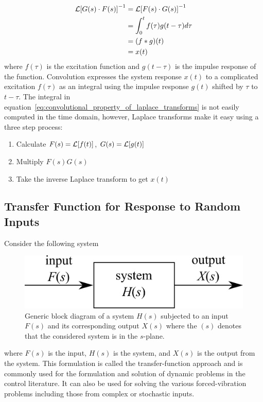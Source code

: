 \documentclass[12pt,letter]{article}
\begin{document}
\begin{align}
\label{eq:convolutional_property_of_laplace_transforms}
\mathcal{L}{\left[G(s) \cdot F(s)\right]}^{-1} &= \mathcal{L}{\left[F(s) \cdot G(s)\right]}^{-1} \\
&= \int_0^t f(\tau) g(t-\tau) d \tau \nonumber \\
&= (f * g)(t)  \nonumber \\ 
&= x(t) \nonumber
\end{align}
where $f(\tau)$ is the excitation function and $g(t-\tau)$ is the impulse response of the function. Convolution expresses the system response $x(t)$ to a complicated excitation $f(\tau)$ as an integral using the impulse response $g(t)$  shifted by $\tau$ to $t-\tau$. 
The integral in equation~\ref{eq:convolutional_property_of_laplace_transforms} is not easily computed in the time domain, however, Laplace transforms make it easy using a three step process:
\begin{enumerate}[noitemsep,topsep=0pt]
\item Calculate $F(s) = \mathcal{L}{\left[f(t)\right]} $, $G(s) = \mathcal{L}{\left[g(t)\right]}$
\item Multiply $F(s)G(s)$
\item Take the inverse Laplace transform to get $x(t)$
\end{enumerate} 

\subsection{Transfer Function for Response to Random Inputs}

			Consider the following system
			\begin{figure}[H]
				\centering
				\includegraphics[]{../figures/transfer_function_system.png}
				\caption{Generic block diagram of a system $H(s)$ subjected to an input $F(s)$ and its corresponding output $X(s)$ where the $(s)$ denotes that the considered system is in the $s$-plane.}
				\label{fig:transfer_function_system}
			\end{figure}
			\noindent where $F(s)$ is the input, $H(s)$ is the system, and $X(s)$ is the output from the system. This formulation is called the transfer-function approach and is commonly used for the formulation and solution of dynamic problems in the control literature. It can also be used for solving the various forced-vibration problems including those from complex or stochastic inputs. 
	
\end{document}
